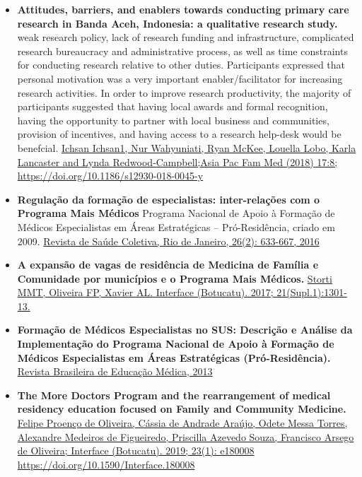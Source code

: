 \documentclass[]{book}
\begin{document}
\begin{itemize}
\item
  \textbf{Attitudes, barriers, and enablers towards conducting primary care research in Banda Aceh, Indonesia: a qualitative research study.} weak research policy, lack of research funding and infrastructure, complicated research bureaucracy and administrative process, as well as time constraints for conducting research relative to other duties. Participants expressed that personal motivation was a very important enabler/facilitator for increasing research activities. In order to improve research productivity, the majority of participants suggested that having local awards and formal recognition, having the opportunity to partner with local business and communities, provision of incentives, and having access to a research help-desk would be benefcial. \href{https://www.ncbi.nlm.nih.gov/pmc/articles/PMC6064079/pdf/12930_2018_Article_45.pdf}{Ichsan Ichsan1, Nur Wahyuniati, Ryan McKee, Louella Lobo, Karla Lancaster and Lynda Redwood‑Campbell;Asia Pac Fam Med (2018) 17:8; https://doi.org/10.1186/s12930-018-0045-y}
\item
  \textbf{Regulação da formação de especialistas: inter-relações com o Programa Mais Médicos} Programa Nacional de Apoio à Formação de Médicos Especialistas em Áreas Estratégicas -- Pró-Residência, criado em 2009. \href{http://www.scielo.br/pdf/physis/v26n2/0103-7331-physis-26-02-00633.pdf}{Revista de Saúde Coletiva, Rio de Janeiro, 26(2): 633-667, 2016}
\item
  \textbf{A expansão de vagas de residência de Medicina de Família e Comunidade por municípios e o Programa Mais Médicos.} \href{http://www.scielo.br/pdf/icse/v21s1/1807-5762-icse-21-s1-1301.pdf}{Storti MMT, Oliveira FP, Xavier AL. Interface (Botucatu). 2017; 21(Supl.1):1301-13.}
\item
  \textbf{Formação de Médicos Especialistas no SUS: Descrição e Análise da Implementação do Programa Nacional de Apoio à Formação de Médicos Especialistas em Áreas Estratégicas (Pró-Residência).} \href{http://www.scielo.br/pdf/rbem/v37n1/11.pdf}{Revista Brasileira de Educação Médica, 2013}
\item
  \textbf{The More Doctors Program and the rearrangement of medical residency education focused on Family and Community Medicine.} \href{http://www.scielo.br/pdf/icse/v23s1/1807-5762-icse-23-s1-e180008.pdf}{Felipe Proenço de Oliveira, Cássia de Andrade Araújo, Odete Messa Torres, Alexandre Medeiros de Figueiredo, Priscilla Azevedo Souza, Francisco Arsego de Oliveira; Interface (Botucatu). 2019; 23(1): e180008 https://doi.org/10.1590/Interface.180008}
\end{itemize}
\end{document}

